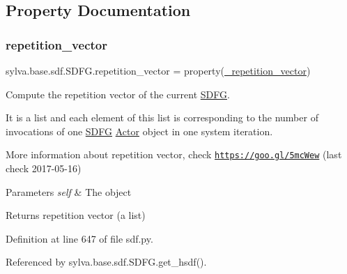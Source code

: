 \subsection{Property Documentation}
\mbox{\label{classsylva_1_1base_1_1sdf_1_1_s_d_f_g_ad5abe5a7b0ab0941a97db69c1e00e116}} 
\subsubsection{\texorpdfstring{repetition\+\_\+vector}{repetition\_vector}}
{\footnotesize\ttfamily sylva.\+base.\+sdf.\+S\+D\+F\+G.\+repetition\+\_\+vector = property(\hyperlink{classsylva_1_1base_1_1sdf_1_1_s_d_f_g_a27f061deddd418fd4945acbd9c01122a}{\+\_\+repetition\+\_\+vector})\hspace{0.3cm}{\ttfamily [static]}}



Compute the repetition vector of the current \hyperlink{classsylva_1_1base_1_1sdf_1_1_s_d_f_g}{S\+D\+FG}. 

It is a list and each element of this list is corresponding to the number of invocations of one \hyperlink{classsylva_1_1base_1_1sdf_1_1_s_d_f_g}{S\+D\+FG} \hyperlink{classsylva_1_1base_1_1sdf_1_1_actor}{Actor} object in one system iteration.

More information about repetition vector, check \href{https://goo.gl/5mcWew}{\tt https\+://goo.\+gl/5mc\+Wew} (last check 2017-\/05-\/16)


\begin{DoxyParams}{Parameters}
{\em self} & The object\\
\hline
\end{DoxyParams}
\begin{DoxyReturn}{Returns}
repetition vector (a list) 
\end{DoxyReturn}


Definition at line 647 of file sdf.\+py.



Referenced by sylva.\+base.\+sdf.\+S\+D\+F\+G.\+get\+\_\+hsdf().

\mbox{\label{classsylva_1_1base_1_1sdf_1_1_s_d_f_g_a5973e8ab996adf42e7fd074cdaa85fdf}} 
